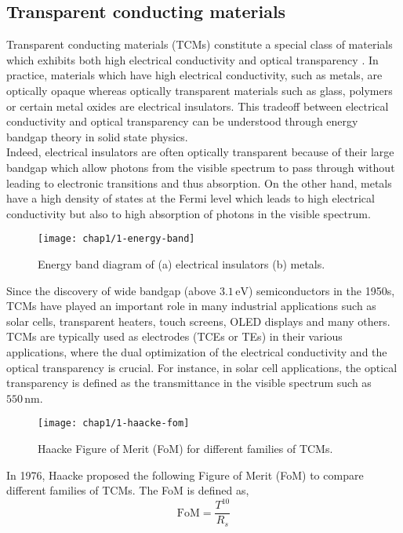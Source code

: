 \subsection{Transparent conducting materials}
    Transparent conducting materials (TCMs) constitute a special class of materials which exhibits both high electrical conductivity and optical transparency \cite{Bardet2021}. In practice, materials which have high electrical conductivity, such as metals, are optically opaque whereas optically transparent materials such as glass, polymers or certain metal oxides are electrical insulators. This tradeoff between electrical conductivity and optical transparency can be understood through energy bandgap theory in solid state physics.\\
    Indeed, electrical insulators are often optically transparent because of their large bandgap 
    which allow photons from the visible spectrum to pass through without leading to electronic transitions and thus absorption. On the other hand, metals have a high density of states at the Fermi level which leads to high electrical conductivity but also to high absorption of photons in the visible spectrum.
    \begin{figure}[H]
        \centering
        \texttt{[image: chap1/1-energy-band]}
        \caption{Energy band diagram of (a) electrical insulators (b) metals.}
        \label{fig:1-bandgap}
    \end{figure}
    Since the discovery of wide bandgap (above $3.1\,\text{eV}$) semiconductors in the 1950s, TCMs have played an important role in many industrial applications such as solar cells, transparent heaters, touch screens, OLED displays and many others. TCMs are typically used as electrodes (TCEs or TEs) in their various applications, where the dual optimization of the electrical conductivity and the optical transparency is crucial. For instance, in solar cell applications, the optical transparency is defined as the transmittance in the visible spectrum such as $550\,\text{nm}$.
    \begin{figure}[H]
        \centering
        \texttt{[image: chap1/1-haacke-fom]}
        \caption{Haacke Figure of Merit (FoM) for different families of TCMs.\cite{LagrangeLangleyGiustiJimenezBrechetBellet2015}}
        \label{fig:1-haacke-fom}
    \end{figure}
    In 1976, Haacke proposed the following Figure of Merit (FoM) to compare different families of TCMs. The FoM is defined as,
    \begin{equation*}
        \text{FoM} = \frac{T^{10}}{R_s}
    \end{equation*}
